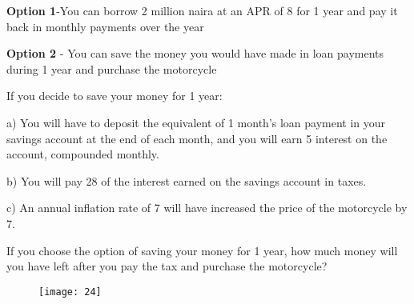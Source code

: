 \documentclass{article}
\begin{document}
\textbf{Option 1}-You can borrow 2 million naira at an APR of 8 for 1 year and pay it back in monthly payments over the year

\textbf{Option 2} - You can save the money you would have made in loan payments during 1 year and purchase the motorcycle

If you decide to save your money for 1 year:

a) You will have to deposit the equivalent of 1 month’s loan payment in your savings account at the end of each month, and you will earn 5 interest on the account, compounded monthly.  

b) You will pay 28 of the interest earned on the savings account in taxes.

c)  An annual inflation rate of 7 will have increased the price of the motorcycle by 7. 

If you choose the option of saving your money for 1 year, how much money will you have left after you pay the tax and purchase the motorcycle?

\begin{figure}[h!]
	\texttt{[image: 24]}
\end{figure}
\end{document}
